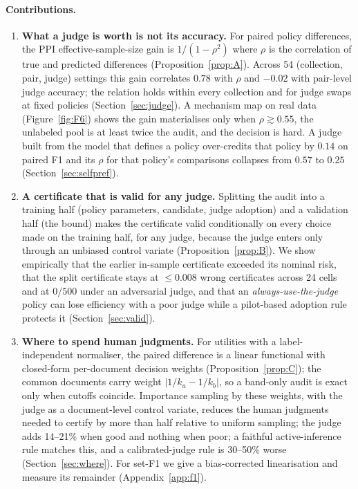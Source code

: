 \documentclass{article}
\begin{document}
\paragraph{Contributions.}
\begin{enumerate}
\item \textbf{What a judge is worth is not its accuracy.} For paired policy differences, the PPI effective-sample-size gain is $1/(1-\rho^2)$ where $\rho$ is the correlation of true and predicted differences (Proposition~\ref{prop:A}). Across 54 (collection, pair, judge) settings this gain correlates $0.78$ with $\rho$ and $-0.02$ with pair-level judge accuracy; the relation holds within every collection and for judge swaps at fixed policies (Section~\ref{sec:judge}). A mechanism map on real data (Figure~\ref{fig:F6}) shows the gain materialises only when $\rho\gtrsim0.55$, the unlabeled pool is at least twice the audit, and the decision is hard. A judge built from the model that defines a policy over-credits that policy by $0.14$ on paired F1 and its $\rho$ for that policy's comparisons collapses from $0.57$ to $0.25$ (Section~\ref{sec:selfpref}).
\item \textbf{A certificate that is valid for any judge.} Splitting the audit into a training half (policy parameters, candidate, judge adoption) and a validation half (the bound) makes the certificate valid conditionally on every choice made on the training half, for any judge, because the judge enters only through an unbiased control variate (Proposition~\ref{prop:B}). We show empirically that the earlier in-sample certificate exceeded its nominal risk, that the split certificate stays at $\le 0.008$ wrong certificates across 24 cells and at $0/500$ under an adversarial judge, and that an \emph{always-use-the-judge} policy can lose efficiency with a poor judge while a pilot-based adoption rule protects it (Section~\ref{sec:valid}).
\item \textbf{Where to spend human judgments.} For utilities with a label-independent normaliser, the paired difference is a linear functional with closed-form per-document decision weights (Proposition~\ref{prop:C}); the common documents carry weight $|1/k_a-1/k_b|$, so a band-only audit is exact only when cutoffs coincide. Importance sampling by these weights, with the judge as a document-level control variate, reduces the human judgments needed to certify by more than half relative to uniform sampling; the judge adds 14--21\% when good and nothing when poor; a faithful active-inference rule matches this, and a calibrated-judge rule is 30--50\% worse (Section~\ref{sec:where}). For set-F1 we give a bias-corrected linearisation and measure its remainder (Appendix~\ref{app:f1}).

\end{enumerate}
\end{document}
